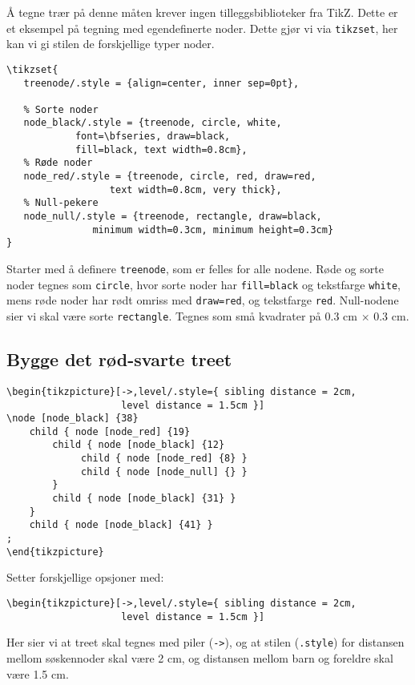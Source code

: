 \documentclass[11pt, a4paper]{article}
\begin{document}
Å tegne trær på denne måten krever ingen tilleggsbiblioteker fra TikZ. Dette er et eksempel på tegning med egendefinerte noder. Dette gjør vi via \texttt{tikzset}, her kan vi gi stilen de forskjellige typer noder.
\begin{Verbatim}[fontsize=\small, frame=single]
\tikzset{
   treenode/.style = {align=center, inner sep=0pt},
	
   % Sorte noder
   node_black/.style = {treenode, circle, white, 
			font=\bfseries, draw=black,
			fill=black, text width=0.8cm},
   % Røde noder
   node_red/.style = {treenode, circle, red, draw=red, 
	              text width=0.8cm, very thick},
   % Null-pekere
   node_null/.style = {treenode, rectangle, draw=black, 
		       minimum width=0.3cm, minimum height=0.3cm}
}
\end{Verbatim}
Starter med å definere \texttt{treenode}, som er felles for alle nodene. Røde og sorte noder tegnes som \texttt{circle}, hvor sorte noder har \texttt{fill=black} og tekstfarge \texttt{white}, mens røde noder har rødt omriss med \texttt{draw=red}, og tekstfarge \texttt{red}. Null-nodene sier vi skal være sorte \texttt{rectangle}. Tegnes som små kvadrater på 0.3 cm $\times$ 0.3 cm.

\newpage
\subsection{Bygge det rød-svarte treet}
\begin{Verbatim}[fontsize=\small, frame=single]
\begin{tikzpicture}[->,level/.style={ sibling distance = 2cm, 
                    level distance = 1.5cm }] 
\node [node_black] {38}
    child { node [node_red] {19} 
        child { node [node_black] {12}
             child { node [node_red] {8} }
             child { node [node_null] {} }
        }
        child { node [node_black] {31} }
    }
    child { node [node_black] {41} }
; 
\end{tikzpicture}
\end{Verbatim}

Setter forskjellige opsjoner med:
\begin{Verbatim}[fontsize=\small, frame=single]
\begin{tikzpicture}[->,level/.style={ sibling distance = 2cm, 
                    level distance = 1.5cm }]
\end{Verbatim}
Her sier vi at treet skal tegnes med piler (\texttt{->}), og at stilen (\texttt{.style}) for distansen mellom søskennoder skal være 2 cm, og distansen mellom barn og foreldre skal være 1.5 cm.
\end{document}
